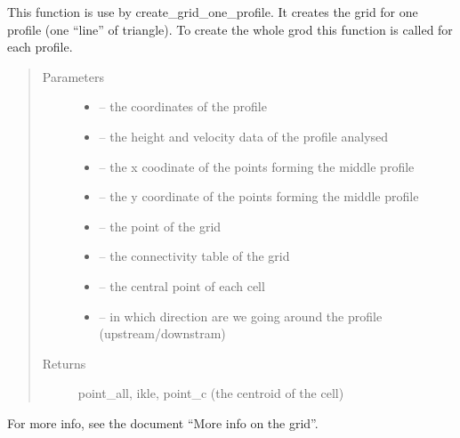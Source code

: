 \documentclass[letterpaper,10pt,english]{sphinxmanual}
\begin{document}

\begin{fulllineitems}
\label{\detokenize{index:src.manage_grid_8.get_new_point_and_cell_1_profil}}
This function is use by create\_grid\_one\_profile. It creates the grid for one profile (one ``line'' of triangle).
To create the whole grod this function is called for each profile.
\begin{quote}\begin{description}
\item[{Parameters}] \leavevmode\begin{itemize}
\item {} 
 -- the coordinates of the profile

\item {} 
 -- the height and velocity data of the profile analysed

\item {} 
 -- the x coodinate of the points forming the middle profile

\item {} 
 -- the y coordinate of the points forming the middle profile

\item {} 
 -- the point of the grid

\item {} 
 -- the connectivity table of the grid

\item {} 
 -- the central point of each cell

\item {} 
 -- in which direction are we going around the profile (upstream/downstram)

\end{itemize}

\item[{Returns}] \leavevmode
point\_all, ikle, point\_c (the centroid of the cell)

\end{description}\end{quote}

For more info, see the document ``More info on the grid''.

\end{fulllineitems}
\end{document}
